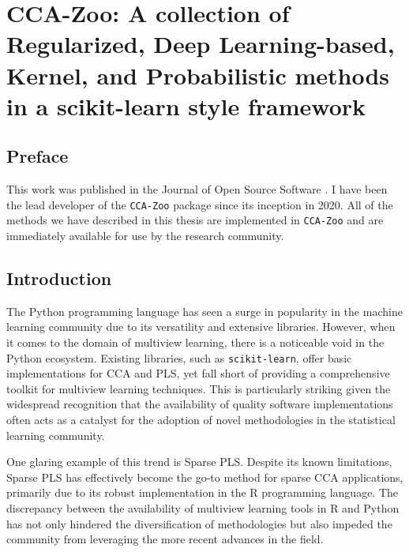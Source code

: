 \graphicspath{{chapters/software/}}


\chapter{CCA-Zoo: A collection of Regularized, Deep Learning-based, Kernel, and Probabilistic methods in a scikit-learn style framework}\label{chap:ccazoo}

\section*{Preface}

This work was published in the Journal of Open Source Software \citep{chapman2021cca}.
I have been the lead developer of the \texttt{CCA-Zoo} package since its inception in 2020.
All of the methods we have described in this thesis are implemented in \texttt{CCA-Zoo} and are immediately available for use by the research community.

\section{Introduction}

The Python programming language has seen a surge in popularity in the machine learning community due to its versatility and extensive libraries.
However, when it comes to the domain of multiview learning, there is a noticeable void in the Python ecosystem.
Existing libraries, such as \texttt{scikit-learn}\cite{pedregosa2011scikit}, offer basic implementations for CCA and PLS, yet fall short of providing a comprehensive toolkit for multiview learning techniques.
This is particularly striking given the widespread recognition that the availability of quality software implementations often acts as a catalyst for the adoption of novel methodologies in the statistical learning community.

One glaring example of this trend is Sparse PLS. Despite its known limitations, Sparse PLS has effectively become the go-to method for sparse CCA applications, primarily due to its robust implementation in the R programming language.
The discrepancy between the availability of multiview learning tools in R and Python has not only hindered the diversification of methodologies but also impeded the community from leveraging the more recent advances in the field.

